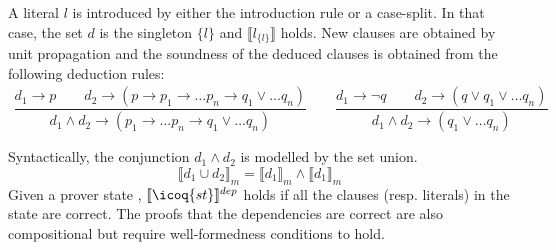 \documentclass[a4paper,UKenglish,cleveref, autoref, thm-restate]{lipics-v2019}
\begin{document}
A literal $l$ is introduced by either the introduction rule or a
case-split. In that case, the set $d$ is the singleton $\{l\}$ and
$\llbracket l_{\{l \}} \rrbracket$ holds. New clauses are obtained by
unit propagation and the soundness of the deduced clauses is obtained
from the following deduction rules:
\[
  \begin{array}{c}
  \dfrac{ d_1 \to p  \qquad d_2 \to (p \to p_1 \to \dots p_n \to q_1 \lor \dots q_n) }
    {d_1 \land d_2 \to (p_1 \to \dots p_n \to q_1 \lor \dots q_n) } \qquad
  \dfrac{ d_1 \to \neg q  \qquad d_2 \to (q \lor q_1 \lor \dots q_n) }
    {d_1 \land d_2 \to (q_1 \lor \dots q_n) }\\\\
  \end{array}
\]
Syntactically, the conjunction $d_1 \land d_2$ is modelled by the set union.
\[
  \llbracket d_1 \cup d_2 \rrbracket_m = \llbracket d_1 \rrbracket_m \land \llbracket d_1 \rrbracket_m
\]
Given a prover state ,
$\llbracket \icoq{st} \rrbracket^{dep}$ holds if all the clauses
(resp. literals) in the state are correct.  The proofs that the
dependencies are correct are also compositional but require
well-formedness conditions to hold.
\end{document}
